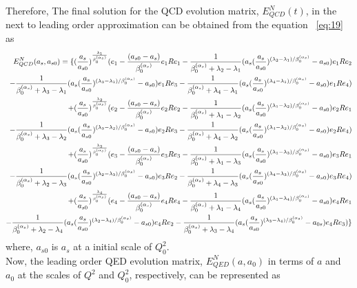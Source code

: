 \documentclass[review]{elsarticle}
\begin{document}
Therefore, The final solution for the QCD evolution matrix, $E_{QCD}^{N}(t)$,
in the next to leading order approximation can be obtained from the equation
~\eqref{eq:19} as
\begin{eqnarray}
E_{QCD}^{N}(a_{s},a_{s0})=\{(\frac{a_{s}}{a_{s0}})^{\frac{\lambda_{1}}{\text{\ensuremath{\beta_{0}^{(\alpha_s)}}}}}(e_{1}-\frac{(\text{\ensuremath{a_{s0}-a_{s})}}}{\text{\ensuremath{\beta_{0}^{(\alpha_s)}}}}e_{1}Re_{1}-\frac{1}{\beta_{0}^{(\alpha_s)}+\lambda_{2}-\lambda_{1}}(a_{s}(\frac{a_{s}}{a_{s0}})^{(\lambda_{2}-\lambda_{1})/\beta_{0}^{(\alpha_s)}}-a_{s0})e_{1}Re_{2}\cr
-\frac{1}{\beta_{0}^{(\alpha_s)}+\lambda_{3}-\lambda_{1}}(a_{s}(\frac{a_{s}}{a_{s0}})^{(\lambda_{3}-\lambda_{1})/\beta_{0}^{(\alpha_s)}}-a_{s0})e_{1}Re_{3}-\frac{1}{\beta_{0}^{(\alpha_s)}+\lambda_{4}-\lambda_{1}}(a_{s}(\frac{a_{s}}{a_{s0}})^{(\lambda_{4}-\lambda_{1})/\beta_{0}^{(\alpha_s)}}-a_{s0})e_{1}Re_{4})\cr
+(\frac{a_{s}}{a_{s0}})^{\frac{\lambda_{2}}{\text{\ensuremath{\beta_{0}^{(\alpha_s)}}}}}(e_{2}-\frac{(\text{\ensuremath{a_{s0}-a_{s})}}}{\text{\ensuremath{\beta_{0}^{(\alpha_s)}}}}e_{2}Re_{2}-\frac{1}{\beta_{0}^{(\alpha_s)}+\lambda_{1}-\lambda_{2}}(a_{s}(\frac{a_{s}}{a_{s0}})^{(\lambda_{1}-\lambda_{2})/\beta_{0}^{(\alpha_s)}}-a_{s0})e_{2}Re_{1}\cr
-\frac{1}{\beta_{0}^{(\alpha_s)}+\lambda_{3}-\lambda_{2}}(a_{s}(\frac{a_{s}}{a_{s0}})^{(\lambda_{3}-\lambda_{2})/\beta_{0}^{(\alpha_s)}}-a_{s0})e_{2}Re_{3}-\frac{1}{\beta_{0}^{(\alpha_s)}+\lambda_{4}-\lambda_{2}}(a_{s}(\frac{a_{s}}{a_{s0}})^{(\lambda_{4}-\lambda_{2})/\beta_{0}^{(\alpha_s)}}-a_{s0})e_{2}Re_{4})\cr
+(\frac{a_{s}}{a_{s0}})^{\frac{\lambda_{3}}{\text{\ensuremath{\beta_{0}^{(\alpha_s)}}}}}(e_{3}-\frac{(\text{\ensuremath{a_{s0}-a_{s})}}}{\text{\ensuremath{\beta_{0}^{(\alpha_s)}}}}e_{3}Re_{3}-\frac{1}{\beta_{0}^{(\alpha_s)}+\lambda_{1}-\lambda_{3}}(a_{s}(\frac{a_{s}}{a_{s0}})^{(\lambda_{1}-\lambda_{3})/\beta_{0}^{(\alpha_s)}}-a_{s0})e_{3}Re_{1}\cr
-\frac{1}{\beta_{0}^{(\alpha_s)}+\lambda_{2}-\lambda_{3}}(a_{s}(\frac{a_{s}}{a_{s0}})^{(\lambda_{2}-\lambda_{3})/\beta_{0}^{(\alpha_s)}}-a_{s0})e_{3}Re_{2}-\frac{1}{\beta_{0}^{(\alpha_s)}+\lambda_{4}-\lambda_{3}}(a_{s}(\frac{a_{s}}{a_{s0}})^{(\lambda_{4}-\lambda_{3})/\beta_{0}^{(\alpha_s)}}-a_{s0})e_{3}Re_{4})\cr
+(\frac{a_{s}}{a_{s0}})^{\frac{\lambda_{4}}{\text{\ensuremath{\beta_{0}^{(\alpha_s)}}}}}(e_{4}-\frac{(\text{\ensuremath{a_{s0}-a_{s})}}}{\text{\ensuremath{\beta_{0}^{(\alpha_s)}}}}e_{4}Re_{4}-\frac{1}{\beta_{0}^{(\alpha_s)}+\lambda_{1}-\lambda_{4}}(a_{s}(\frac{a_{s}}{a_{s0}})^{(\lambda_{1}-\lambda_{4})/\beta_{0}^{(\alpha_s)}}-a_{s0})e_{4}Re_{1}\cr
-\frac{1}{\beta_{0}^{(\alpha_s)}+\lambda_{2}-\lambda_{4}}(a_{s}(\frac{a_{s}}{a_{s0}})^{(\lambda_{2}-\lambda_{4})/\beta_{0}^{(\alpha_s)}}-a_{s0})e_{4}Re_{2}-\frac{1}{\beta_{0}^{(\alpha_s)}+\lambda_{3}-\lambda_{4}}(a_{s}(\frac{a_{s}}{a_{s0}})^{(\lambda_{3}-\lambda_{4})/\beta_{0}^{(\alpha_s)}}-a_{0s})e_{4}Re_{3})\}\label{eq:25}
\end{eqnarray}
where, $a_{s0}$ is $a_{s}$ at a initial scale of $Q_{0}^{2}$.
\\
Now, the leading order QED evolution matrix, $E_{QED}^{N}(a,a_{0})$ in terms of $a$ and $a_{0}$ at the scales of $Q^{2}$ and $Q_{0}^{2}$, respectively, can be represented as
\end{document}
